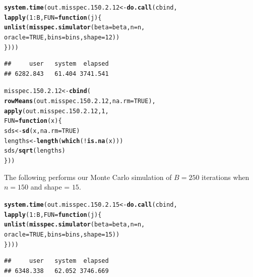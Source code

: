 \documentclass[11pt]{article}\usepackage[]{graphicx}\usepackage[]{color}
\makeatletter
\newcommand{\hlnum}[1]{\textcolor[rgb]{0.686,0.059,0.569}{#1}}%
\newcommand{\hlopt}[1]{\textcolor[rgb]{0,0,0}{#1}}%
\newcommand{\hlstd}[1]{\textcolor[rgb]{0.345,0.345,0.345}{#1}}%
\newcommand{\hlkwa}[1]{\textcolor[rgb]{0.161,0.373,0.58}{\textbf{#1}}}%
\newcommand{\hlkwb}[1]{\textcolor[rgb]{0.69,0.353,0.396}{#1}}%
\newcommand{\hlkwc}[1]{\textcolor[rgb]{0.333,0.667,0.333}{#1}}%
\newcommand{\hlkwd}[1]{\textcolor[rgb]{0.737,0.353,0.396}{\textbf{#1}}}%
\newenvironment{kframe}{%
 \def\at@end@of@kframe{}%
 \ifinner\ifhmode%
  \def\at@end@of@kframe{\end{minipage}}%
  \begin{minipage}{\columnwidth}%
 \fi\fi%
 \def\FrameCommand##1{\hskip\@totalleftmargin \hskip-\fboxsep
 \colorbox{shadecolor}{##1}\hskip-\fboxsep
     \hskip-\linewidth \hskip-\@totalleftmargin \hskip\columnwidth}%
 \MakeFramed {\advance\hsize-\width
   \@totalleftmargin\z@ \linewidth\hsize
   \@setminipage}}%
 {\par\unskip\endMakeFramed%
 \at@end@of@kframe}
\newenvironment{knitrout}{}{} %
\makeatother
\begin{document}
\begin{knitrout}
\color{fgcolor}\begin{kframe}
\begin{alltt}
\hlkwd{system.time}\hlstd{(out.misspec.150.2.12} \hlkwb{<-} \hlkwd{do.call}\hlstd{(cbind,}
  \hlkwd{lapply}\hlstd{(}\hlnum{1}\hlopt{:}\hlstd{B,} \hlkwc{FUN} \hlstd{=} \hlkwa{function}\hlstd{(}\hlkwc{j}\hlstd{)\{}
    \hlkwd{unlist}\hlstd{(}\hlkwd{misspec.simulator}\hlstd{(}\hlkwc{beta} \hlstd{= beta,} \hlkwc{n} \hlstd{= n,}
      \hlkwc{oracle} \hlstd{=} \hlnum{TRUE}\hlstd{,} \hlkwc{bins} \hlstd{= bins,} \hlkwc{shape} \hlstd{=} \hlnum{12}\hlstd{))}
\hlstd{\})))}
\end{alltt}
\begin{verbatim}
##     user   system  elapsed 
## 6282.843   61.404 3741.541
\end{verbatim}
\end{kframe}
\end{knitrout}

\begin{knitrout}
\color{fgcolor}\begin{kframe}
\begin{alltt}
\hlstd{misspec.150.2.12} \hlkwb{<-} \hlkwd{cbind}\hlstd{(}
  \hlkwd{rowMeans}\hlstd{(out.misspec.150.2.12,} \hlkwc{na.rm} \hlstd{=} \hlnum{TRUE}\hlstd{),}
  \hlkwd{apply}\hlstd{(out.misspec.150.2.12,} \hlnum{1}\hlstd{,}
  \hlkwc{FUN} \hlstd{=} \hlkwa{function}\hlstd{(}\hlkwc{x}\hlstd{)\{}
    \hlstd{sds} \hlkwb{<-} \hlkwd{sd}\hlstd{(x,} \hlkwc{na.rm} \hlstd{=} \hlnum{TRUE}\hlstd{)}
    \hlstd{lengths} \hlkwb{<-} \hlkwd{length}\hlstd{(}\hlkwd{which}\hlstd{(}\hlopt{!}\hlkwd{is.na}\hlstd{(x)))}
    \hlstd{sds} \hlopt{/} \hlkwd{sqrt}\hlstd{(lengths)}
  \hlstd{\}))}
\end{alltt}
\end{kframe}
\end{knitrout}

The following performs our Monte Carlo simulation of $B = 250$ iterations 
when $n = 150$ and shape = $15$.

\begin{knitrout}
\color{fgcolor}\begin{kframe}
\begin{alltt}
\hlkwd{system.time}\hlstd{(out.misspec.150.2.15} \hlkwb{<-} \hlkwd{do.call}\hlstd{(cbind,}
  \hlkwd{lapply}\hlstd{(}\hlnum{1}\hlopt{:}\hlstd{B,} \hlkwc{FUN} \hlstd{=} \hlkwa{function}\hlstd{(}\hlkwc{j}\hlstd{)\{}
    \hlkwd{unlist}\hlstd{(}\hlkwd{misspec.simulator}\hlstd{(}\hlkwc{beta} \hlstd{= beta,} \hlkwc{n} \hlstd{= n,}
      \hlkwc{oracle} \hlstd{=} \hlnum{TRUE}\hlstd{,} \hlkwc{bins} \hlstd{= bins,} \hlkwc{shape} \hlstd{=} \hlnum{15}\hlstd{))}
\hlstd{\})))}
\end{alltt}
\begin{verbatim}
##     user   system  elapsed 
## 6348.338   62.052 3746.669
\end{verbatim}
\end{kframe}
\end{knitrout}
\end{document}
